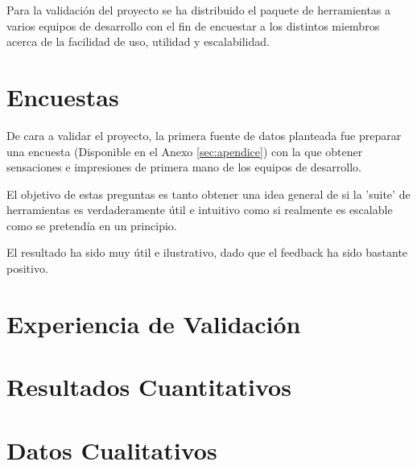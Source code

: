 Para la validación del proyecto se ha distribuido el paquete de herramientas a varios equipos de desarrollo con el fin de encuestar a los distintos miembros acerca de la facilidad de uso, utilidad y escalabilidad.

\section{Encuestas}

De cara a validar el proyecto, la primera fuente de datos planteada fue preparar una encuesta (Disponible en el Anexo \ref{sec:apendice}) con la que obtener sensaciones e impresiones de primera mano de los equipos de desarrollo.

El objetivo de estas preguntas es tanto obtener una idea general de si la 'suite' de herramientas es verdaderamente útil e intuitivo como si realmente es escalable como se pretendía en un principio.

El resultado ha sido muy útil e ilustrativo, dado que el feedback ha sido bastante positivo. 

\section{Experiencia de Validación}

\section{Resultados Cuantitativos}

\section{Datos Cualitativos}

